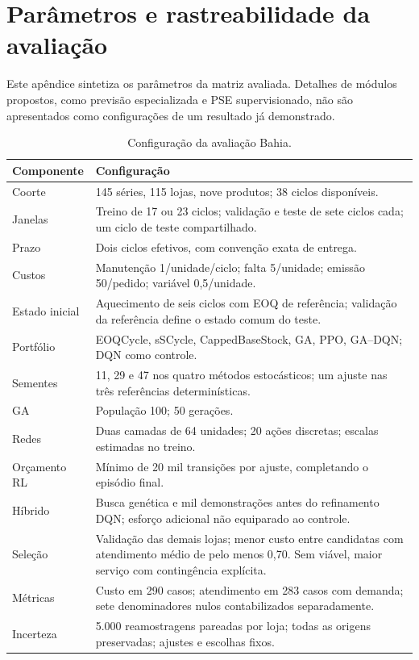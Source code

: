 \appendix
\chapter{Parâmetros e rastreabilidade da avaliação}
\label{app:reproducibility}

Este apêndice sintetiza os parâmetros da matriz avaliada. Detalhes de módulos propostos, como previsão especializada e PSE supervisionado, não são apresentados como configurações de um resultado já demonstrado.

\begin{table}[htbp]\centering\small
\caption{Configuração da avaliação Bahia.}
\begin{tabular}{@{}p{3cm}p{11.4cm}@{}}\toprule
Componente & Configuração\\\midrule
Coorte & 145 séries, 115 lojas, nove produtos; 38 ciclos disponíveis.\\
Janelas & Treino de 17 ou 23 ciclos; validação e teste de sete ciclos cada; um ciclo de teste compartilhado.\\
Prazo & Dois ciclos efetivos, com convenção exata de entrega.\\
Custos & Manutenção 1/unidade/ciclo; falta 5/unidade; emissão 50/pedido; variável 0,5/unidade.\\
Estado inicial & Aquecimento de seis ciclos com EOQ de referência; validação da referência define o estado comum do teste.\\
Portfólio & EOQCycle, sSCycle, CappedBaseStock, GA, PPO, GA--DQN; DQN como controle.\\
Sementes & 11, 29 e 47 nos quatro métodos estocásticos; um ajuste nas três referências determinísticas.\\
GA & População 100; 50 gerações.\\
Redes & Duas camadas de 64 unidades; 20 ações discretas; escalas estimadas no treino.\\
Orçamento RL & Mínimo de 20 mil transições por ajuste, completando o episódio final.\\
Híbrido & Busca genética e mil demonstrações antes do refinamento DQN; esforço adicional não equiparado ao controle.\\
Seleção & Validação das demais lojas; menor custo entre candidatas com atendimento médio de pelo menos 0,70. Sem viável, maior serviço com contingência explícita.\\
Métricas & Custo em 290 casos; atendimento em 283 casos com demanda; sete denominadores nulos contabilizados separadamente.\\
Incerteza & 5.000 reamostragens pareadas por loja; todas as origens preservadas; ajustes e escolhas fixos.\\
\bottomrule\end{tabular}\end{table}

